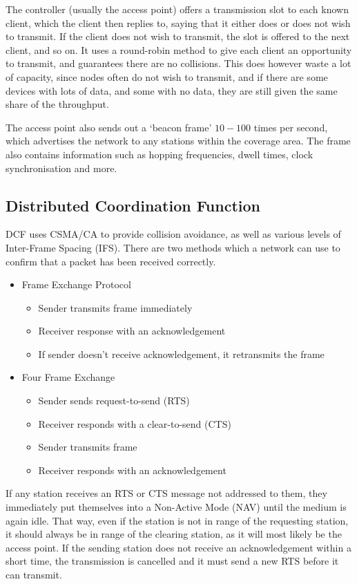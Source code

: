 The controller (usually the access point) offers a transmission slot to each known client, which the client then replies
 to, saying that it either does or does not wish to transmit. If the client does not wish to transmit, the slot is
 offered to the next client, and so on. It uses a round-robin method to give each client an opportunity to transmit, and
 guarantees there are no collisions. This does however waste a lot of capacity, since nodes often do not wish to
 transmit, and if there are some devices with lots of data, and some with no data, they are still given the same share
 of the throughput.

The access point also sends out a `beacon frame' $10-100$ times per second, which advertises the network to any stations
 within the coverage area. The frame also contains information such as hopping frequencies, dwell times, clock
 synchronisation and more.

\subsection*{Distributed Coordination Function}

DCF uses CSMA/CA to provide collision avoidance, as well as various levels of Inter-Frame Spacing (IFS). There are two
 methods which a network can use to confirm that a packet has been received correctly.
\begin{itemize}
  \item Frame Exchange Protocol
  \begin{itemize}
    \item Sender transmits frame immediately
    \item Receiver response with an acknowledgement
    \item If sender doesn't receive acknowledgement, it retransmits the frame
  \end{itemize}
  \item Four Frame Exchange
  \begin{itemize}
    \item Sender sends request-to-send (RTS)
    \item Receiver responds with a clear-to-send (CTS)
    \item Sender transmits frame
    \item Receiver responds with an acknowledgement
  \end{itemize}
\end{itemize}

If any station receives an RTS or CTS message not addressed to them, they immediately put themselves into a Non-Active
 Mode (NAV) until the medium is again idle. That way, even if the station is not in range of the requesting station, it
 should always be in range of the clearing station, as it will most likely be the access point. If the sending station
 does not receive an acknowledgement within a short time, the transmission is cancelled and it must send a new RTS
 before it can transmit.

